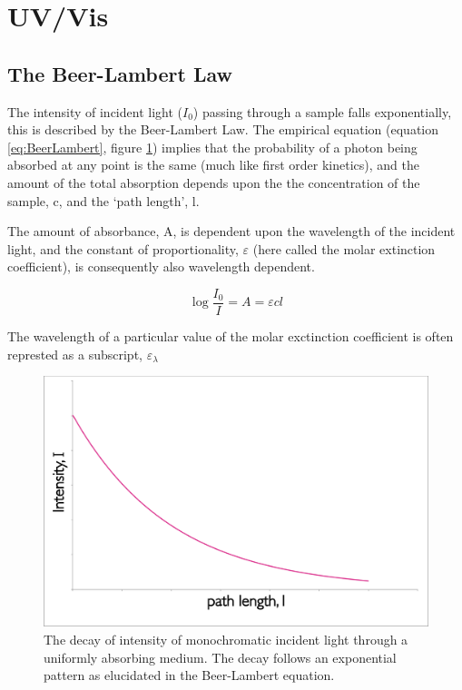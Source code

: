 \documentclass[
]{book}
\begin{document}
\hypertarget{sec:UV}{%
\section{UV/Vis}\label{sec:UV}}

\hypertarget{the-beer-lambert-law}{%
\subsection{The Beer-Lambert Law}\label{the-beer-lambert-law}}

The intensity of incident light (\(I_0\)) passing through a sample falls exponentially, this is described by the Beer-Lambert Law. The empirical equation (equation \eqref{eq:BeerLambert}, figure \ref{fig:BeerLambert}) implies that the probability of a photon being absorbed at any point is the same (much like first order kinetics), and the amount of the total absorption depends upon the the concentration of the sample, c, and the `path length', l.

The amount of absorbance, A, is dependent upon the wavelength of the incident light, and the constant of proportionality, \(\varepsilon\) (here called the molar extinction coefficient), is consequently also wavelength dependent.

\begin{equation}
\log \frac{I_0}{I}=A=\varepsilon cl
\label{eq:BeerLambert}
\end{equation}

The wavelength of a particular value of the molar exctinction coefficient is often represted as a subscript, \(\varepsilon _\lambda\)

\begin{figure}

{\centering \includegraphics[width=0.5\linewidth]{images/BeerLambert} 

}

\caption{The decay of intensity of monochromatic incident light through a uniformly absorbing medium. The decay follows an exponential pattern as elucidated in the Beer-Lambert equation.}\label{fig:BeerLambert}
\end{figure}
\end{document}
